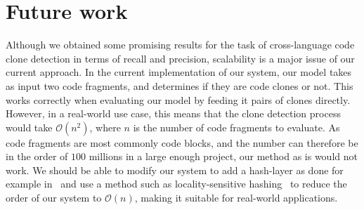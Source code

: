 \section{\label{sec:future-work}Future work}
Although we obtained some promising results for the task of cross-language code
clone detection in terms of recall and precision, scalability is a major issue
of our current approach. In the current implementation of our system, our model
takes as input two code fragments, and determines if they are code clones or
not. This works correctly when evaluating our model by feeding it pairs of
clones directly. However, in a real-world use case, this means that the clone
detection process would take $\mathcal{O}\left(n^2\right)$, where $n$ is the
number of code fragments to evaluate. As code fragments are most commonly code
blocks, and the number can therefore be in the order of $100$ millions in a
large enough project, our method as is would not work. We should be able to
modify our system to add a hash-layer as done for example
in~\cite{ijcai2017-423} and use a method such as locality-sensitive
hashing~\cite{Datar:2004:LHS:997817.997857} to reduce the order of our system to
$\mathcal{O}(n)$, making it suitable for real-world applications.

